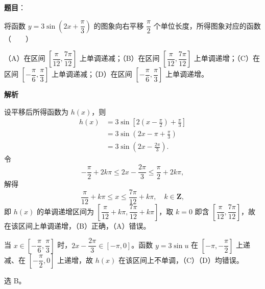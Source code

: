 \begin{answer}

\textbf{题目}：

将函数 $y=3\sin\left(2x+\dfrac\pi3\right)$ 的图象向右平移 $\dfrac\pi2$ 个单位长度，所得图象对应的函数\mbox{（　　）}

（A）在区间 $\left[\dfrac\pi{12},\dfrac{7\pi}{12}\right]$ 上单调递减；（B）在区间 $\left[\dfrac\pi{12},\dfrac{7\pi}{12}\right]$ 上单调递增；（C）在区间 $\left[-\dfrac\pi6,\dfrac\pi3\right]$ 上单调递减；（D）在区间 $\left[-\dfrac\pi6,\dfrac\pi3\right]$ 上单调递增。

\textbf{解析}

设平移后所得函数为 $h(x)$，则
\nopagebreak[4]
\[\begin{aligned}
h(x)&=3\sin\left[2\left(x-\frac\pi2\right)+\frac\pi3\right]\\
&=3\sin\left(2x-\pi+\frac\pi3\right)\\
&=3\sin\left(2x-\frac{2\pi}3\right).
\end{aligned}\]
令
\nopagebreak[4]
\[-\frac\pi2+2k\pi\leqslant 2x-\frac{2\pi}3\leqslant\frac\pi2+2k\pi,\]
解得
\nopagebreak[4]
\[\frac\pi{12}+k\pi\leqslant x\leqslant\frac{7\pi}{12}+k\pi,\quad k\in\mathbf Z,\]
即 $h(x)$ 的单调递增区间为 $\left[\dfrac\pi{12}+k\pi,\dfrac{7\pi}{12}+k\pi\right]$，取 $k=0$ 即含 $\left[\dfrac\pi{12},\dfrac{7\pi}{12}\right]$，故在该区间上单调递增，（B）正确，（A）错误。

当 $x\in\left[-\dfrac\pi6,\dfrac\pi3\right]$ 时，$2x-\dfrac{2\pi}3\in[-\pi,0]$。函数 $y=3\sin u$ 在 $\left[-\pi,-\dfrac\pi2\right]$ 上递减、在 $\left[-\dfrac\pi2,0\right]$ 上递增，故 $h(x)$ 在该区间上不单调，（C）（D）均错误。

选 B。


\end{answer}
